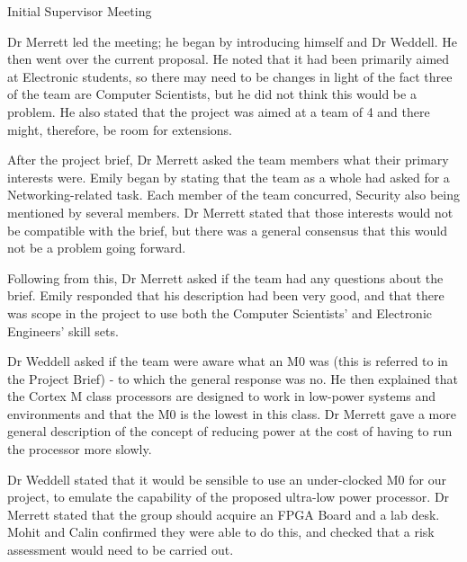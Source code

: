 \documentclass{article}
\begin{document}

\begin{Minutes}{Initial Supervisor Meeting}
\starttime{15:00}
\endtime{16:00}
\location{59/4227}
\maketitle

\topic{Introduction}
Dr Merrett led the meeting; he began by introducing himself and Dr
Weddell. He then went over the current
proposal.
He noted that it had
been primarily aimed at Electronic students, so there may need to be
changes in light of the fact three of the team are Computer
Scientists, but he did not think this would be a problem. He also stated
that the project was aimed at a team of 4 and there might, therefore, be
room for extensions.

After the project brief, Dr Merrett asked the team members what their
primary interests were. Emily began by stating that the team as a whole
had asked for a Networking-related task. Each member of the team
concurred, Security also being mentioned by several members. Dr Merrett
stated that those interests would not be compatible with the brief, but
there was a general consensus that this would not be a problem going
forward.

Following from this, Dr Merrett asked if the team had any questions
about the brief. Emily responded that his
description had been very good, and that there was scope in the project
to use both the Computer Scientists' and Electronic Engineers' skill sets.

Dr Weddell asked if the team were aware what an M0 was (this is referred
to in the Project Brief) - to which the general response was no. He then
explained that the Cortex M class processors are designed to work in
low-power systems and environments and that the M0 is the lowest in this
class. Dr Merrett gave a more general description of the concept of
reducing power at the cost of having to run the processor more slowly.

Dr Weddell stated that it would be sensible to use an under-clocked M0
for our project, to emulate the capability of the proposed ultra-low
power processor. Dr Merrett stated that the group should acquire an FPGA Board
and a lab desk. Mohit and Calin confirmed they were able to do this, and
checked that a risk assessment would need to be carried out.


\end{Minutes}
\end{document}
